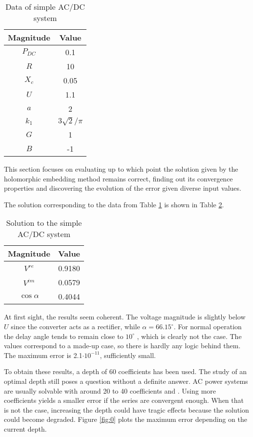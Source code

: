 \documentclass[conference]{IEEEtran}
\begin{document}
\begin{table}[!ht]
\renewcommand{\arraystretch}{1.0}
\caption{Data of simple AC/DC system}
\label{tab:1}
\centering
\begin{tabular}{cc}
\hline
Magnitude & Value\\
\hline
$P_{DC}$ & 0.1\\
$R$ & 10\\
$X_c$ & 0.05\\
$U$ & 1.1\\
$a$ & 2\\
$k_1$ & $3\sqrt{2}/\pi$ \\
$G$ & 1\\
$B$ & -1\\
\hline
\end{tabular}
\end{table}

This section focuses on evaluating up to which point the solution given by the holomorphic embedding method remains correct, finding out its convergence properties and discovering the evolution of the error given diverse input values. 

The solution corresponding to the data from Table \ref{tab:1} is shown in Table \ref{tab:2}.
\begin{table}[!ht]
\renewcommand{\arraystretch}{1.0}
\caption{Solution to the simple AC/DC system}
\label{tab:2}
\centering
\begin{tabular}{cc}
\hline
Magnitude & Value\\
\hline
$V^{re}$ & 0.9180\\
$V^{im}$ & 0.0579\\
$\cos\alpha$ & 0.4044\\
\hline
\end{tabular}
\end{table}

At first sight, the results seem coherent. The voltage magnitude is slightly below $U$ since the converter acts as a rectifier, while $\alpha=66.15^{\circ}$. For normal operation the delay angle tends to remain close to $10^{\circ}$ \cite{Kothari}, which is clearly not the case. The values correspond to a made-up case, so there is hardly any logic behind them. The maximum error is 2.1$\cdot 10^{-11}$, sufficiently small. 

To obtain these results, a depth of 60 coefficients has been used. The study of an optimal depth still poses a question without a definite answer. AC power systems are usually solvable with around 20 to 40 coefficients \cite{Rao} and \cite{Trias2018}. Using more coefficients yields a smaller error if the series are convergent enough. When that is not the case, increasing the depth could have tragic effects because the solution could become degraded. Figure \ref{fig:0} plots the maximum error depending on the current depth. 
\end{document}
